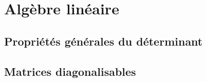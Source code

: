 \section{Algèbre linéaire} 
\newcommand{\alglin}{/home/robin/ENSEIGN/Cours/MathBiologie/L3-ENS-Math1/Exercices/AlgLin}

\subsection{Propriétés générales du déterminant}%





\subsection{Matrices diagonalisables}%

% 





% 


